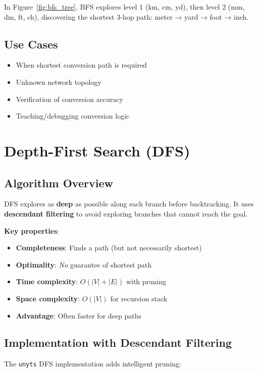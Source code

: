 \documentclass[11pt,a4paper]{report}
\begin{document}
In Figure~\ref{fig:bfs_tree}, BFS explores level 1 (km, cm, yd), then level 2 (mm, dm, ft, ch), discovering the shortest 3-hop path: meter → yard → foot → inch.

\subsection{Use Cases}

\begin{itemize}[leftmargin=*]
  \item When shortest conversion path is required
  \item Unknown network topology
  \item Verification of conversion accuracy
  \item Teaching/debugging conversion logic
\end{itemize}

\section{Depth-First Search (DFS)}

\subsection{Algorithm Overview}

DFS explores as \textbf{deep} as possible along each branch before backtracking. It uses \textbf{descendant filtering} to avoid exploring branches that cannot reach the goal.

\textbf{Key properties}:
\begin{itemize}[leftmargin=*]
  \item \textbf{Completeness}: Finds a path (but not necessarily shortest)
  \item \textbf{Optimality}: \emph{No} guarantee of shortest path
  \item \textbf{Time complexity}: $O(|V| + |E|)$ with pruning
  \item \textbf{Space complexity}: $O(|V|)$ for recursion stack
  \item \textbf{Advantage}: Often faster for deep paths
\end{itemize}

\subsection{Implementation with Descendant Filtering}

The \texttt{unyts} DFS implementation adds intelligent pruning:
\end{document}
